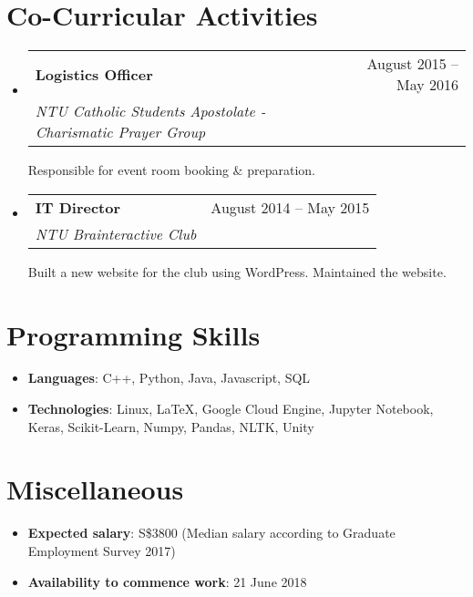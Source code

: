 \documentclass[letterpaper,12pt]{article}
\makeatletter
\newcommand{\resumeSubheading}[4]{
  \vspace{-1pt}\item
    \begin{tabular*}{0.97\textwidth}{l@{\extracolsep{\fill}}r}
      \textbf{#1} & #2 \\
      \textit{\small#3} & \textit{\small #4} \\
    \end{tabular*}\vspace{-5pt}
}
\newcommand{\resumeSubHeadingListStart}{\begin{itemize}[leftmargin=*]}
\newcommand{\resumeSubHeadingListEnd}{\end{itemize}}
\makeatother
\begin{document}
\section{Co-Curricular Activities}
\resumeSubHeadingListStart
    \resumeSubheading
      {Logistics Officer}{August 2015 -- May 2016}
      {NTU Catholic Students Apostolate - Charismatic Prayer Group}{}
        \begin{outline}
         \1 Responsible for event room booking \& preparation.
        \end{outline}
    \resumeSubheading
      {IT Director}{August 2014 -- May 2015}
      {NTU Brainteractive Club}{}
        \begin{outline}
         \vspace{-4pt}
         \1 Built a new website for the club using WordPress.
         \vspace{-4pt}
         \1 Maintained the website.
         \vspace{-4pt}
        \end{outline}
\resumeSubHeadingListEnd

\section{Programming Skills}
\resumeSubHeadingListStart
\item{
  \textbf{Languages}{: C++, Python, Java, Javascript, SQL}\\
}
\item{
  \textbf{Technologies}{: Linux, LaTeX, Google Cloud Engine, Jupyter Notebook, Keras, Scikit-Learn, Numpy, Pandas, NLTK, Unity}
}
  \resumeSubHeadingListEnd

\section{Miscellaneous}
\resumeSubHeadingListStart
\item{
  \textbf{Expected salary}{: S\$3800 (Median salary according to Graduate Employment Survey 2017)}\\
}
\item{
  \textbf{Availability to commence work}{: 21 June 2018}
}
  \resumeSubHeadingListEnd

\end{document}
